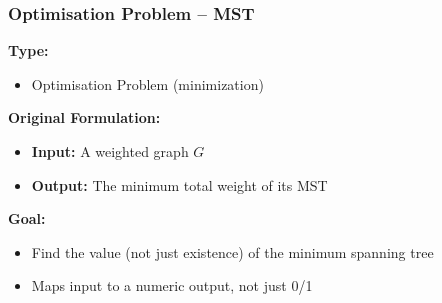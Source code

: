 \begin{frame}
  \frametitle{Optimisation Problem – MST}
  
  \textbf{Type:}
  \begin{itemize}
      \item Optimisation Problem (minimization)
  \end{itemize}
  
  \vspace{0.3cm}
  
  \textbf{Original Formulation:}
  \begin{itemize}
      \item \textbf{Input:} A weighted graph $G$
      \vspace{3pt}
      \item \textbf{Output:} The minimum total weight of its MST
  \end{itemize}
  
  \vspace{0.3cm}
  
  \textbf{Goal:}
  \begin{itemize}
      \item Find the value (not just existence) of the minimum spanning tree
      \vspace{3pt}
      \item Maps input to a numeric output, not just 0/1
  \end{itemize}
\end{frame}

